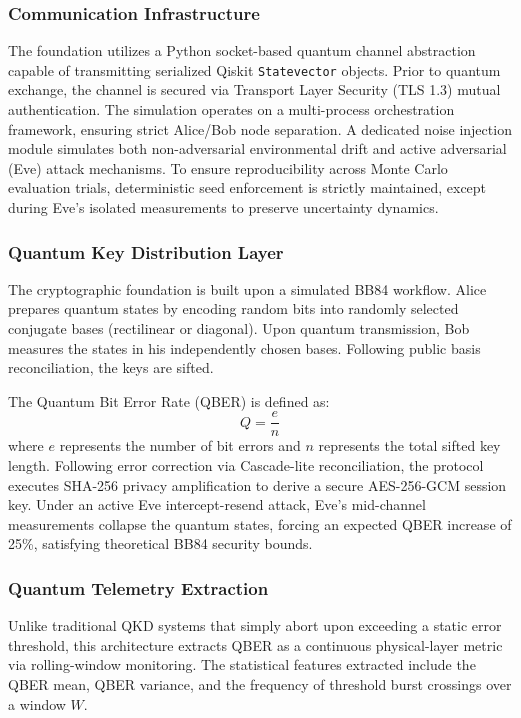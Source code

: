 \subsubsection{Communication Infrastructure}
The foundation utilizes a Python socket-based quantum channel abstraction capable of transmitting serialized Qiskit \texttt{Statevector} objects. Prior to quantum exchange, the channel is secured via Transport Layer Security (TLS 1.3) mutual authentication. The simulation operates on a multi-process orchestration framework, ensuring strict Alice/Bob node separation. A dedicated noise injection module simulates both non-adversarial environmental drift and active adversarial (Eve) attack mechanisms. To ensure reproducibility across Monte Carlo evaluation trials, deterministic seed enforcement is strictly maintained, except during Eve's isolated measurements to preserve uncertainty dynamics.

\subsubsection{Quantum Key Distribution Layer}
The cryptographic foundation is built upon a simulated BB84 workflow. Alice prepares quantum states by encoding random bits into randomly selected conjugate bases (rectilinear or diagonal). Upon quantum transmission, Bob measures the states in his independently chosen bases. Following public basis reconciliation, the keys are sifted. 

The Quantum Bit Error Rate (QBER) is defined as:
\begin{equation}
Q = \frac{e}{n}
\end{equation}
where $e$ represents the number of bit errors and $n$ represents the total sifted key length. Following error correction via Cascade-lite reconciliation, the protocol executes SHA-256 privacy amplification to derive a secure AES-256-GCM session key. Under an active Eve intercept-resend attack, Eve's mid-channel measurements collapse the quantum states, forcing an expected QBER increase of 25\%, satisfying theoretical BB84 security bounds.

\subsubsection{Quantum Telemetry Extraction}
Unlike traditional QKD systems that simply abort upon exceeding a static error threshold, this architecture extracts QBER as a continuous physical-layer metric via rolling-window monitoring. The statistical features extracted include the QBER mean, QBER variance, and the frequency of threshold burst crossings over a window $W$. 

